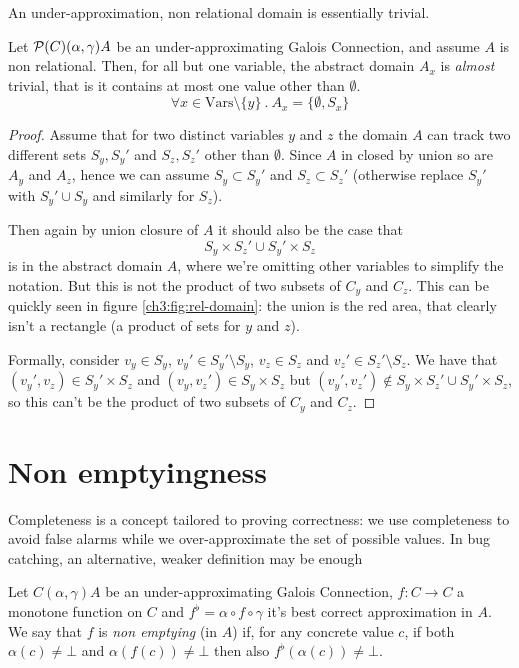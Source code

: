 An under-approximation, non relational domain is essentially trivial.
\begin{prop}\label{ch3:th:underapprox-non-rel}
	Let $\mathcal{P}(C) (\alpha, \gamma) A$ be an under-approximating Galois Connection, and assume $A$ is non relational. Then, for all but one variable, the abstract domain $A_x$ is \textit{almost} trivial, that is it contains at most one value other than $\emptyset$.
	\[
	\forall x \in \text{Vars} \setminus \{ y \} \ .\ A_x = \{ \emptyset, S_x \}
	\]
\end{prop}
\begin{proof}
	Assume that for two distinct variables $y$ and $z$ the domain $A$ can track two different sets $S_y, S_y'$ and $S_z, S_z'$ other than $\emptyset$.
	Since $A$ in closed by union %
	so are $A_y$ and $A_z$, hence we can assume $S_y \subset S_y'$ and $S_z \subset S_z'$ (otherwise replace $S_y'$ with $S_y' \cup S_y$ and similarly for $S_z$).
	
	Then again by union closure of $A$ it should also be the case that
	\[
	S_y \times S_z' \cup S_y' \times S_z
	\]
	is in the abstract domain $A$, where we're omitting other variables to simplify the notation. But this is not the product of two subsets of $C_y$ and $C_z$. This can be quickly seen in figure \ref{ch3:fig:rel-domain}: the union is the red area, that clearly isn't a rectangle (a product of sets for $y$ and $z$).

	Formally, consider $v_y \in S_y$, $v_y' \in S_y' \setminus S_y$, $v_z \in S_z$ and $v_z' \in S_z' \setminus S_z$. We have that $(v_y', v_z) \in S_y' \times S_z$ and $(v_y, v_z') \in S_y \times S_z$ but $(v_y', v_z') \notin S_y \times S_z' \cup S_y' \times S_z$, so this can't be the product of two subsets of $C_y$ and $C_z$.
\end{proof}
\begin{figure}[!th]
\end{figure}

\section{Non emptyingness}
Completeness is a concept tailored to proving correctness: we use completeness to avoid false alarms while we over-approximate the set of possible values. In bug catching, an alternative, weaker definition may be enough
\begin{definition}\label{ch3:def:non-emptying}
	Let $C (\alpha, \gamma) A$ be an under-approximating Galois Connection, $f : C \rightarrow C$ a monotone function on $C$ and $f^{\flat} = \alpha \circ f \circ \gamma$ it's best correct approximation in $A$.
	We say that $f$ is \textit{non emptying} (in $A$) if, for any concrete value $c$, if both $\alpha(c) \neq \bot$ and $\alpha(f(c)) \neq \bot$ then also $f^{\flat}(\alpha(c)) \neq \bot$.
\end{definition}

